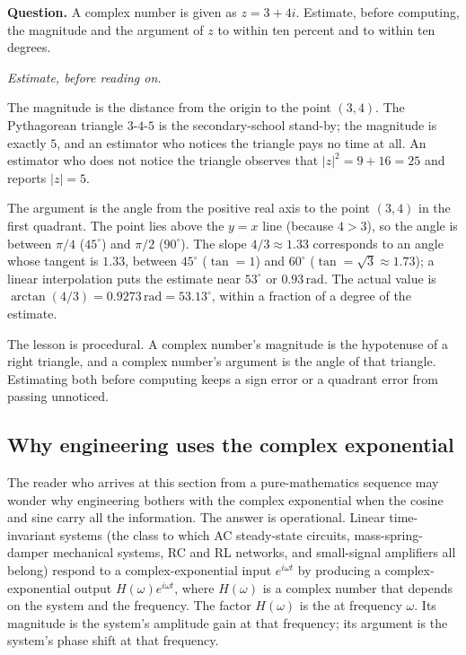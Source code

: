 \begin{estimation}
\textbf{Question.} A complex number is given as $z = 3 + 4i$.
Estimate, before computing, the magnitude and the argument of
$z$ to within ten percent and to within ten degrees.

\smallskip
\textit{Estimate, before reading on.}

\smallskip
The magnitude is the distance from the origin to the point
$(3, 4)$. The Pythagorean triangle $3$-$4$-$5$ is the
secondary-school stand-by; the magnitude is exactly $5$, and an
estimator who notices the triangle pays no time at all. An
estimator who does not notice the triangle observes that
$|z|^{2} = 9 + 16 = 25$ and reports $|z| = 5$.

The argument is the angle from the positive real axis to the
point $(3, 4)$ in the first quadrant. The point lies above the
$y = x$ line (because $4 > 3$), so the angle is between $\pi/4$
($45^{\circ}$) and $\pi/2$ ($90^{\circ}$). The slope $4/3 \approx
1.33$ corresponds to an angle whose tangent is $1.33$, between
$45^{\circ}$ ($\tan = 1$) and $60^{\circ}$ ($\tan = \sqrt{3}
\approx 1.73$); a linear interpolation puts the estimate near
$53^{\circ}$ or $0.93 \,\text{rad}$. The actual value is
$\arctan(4/3) = 0.9273 \,\text{rad} = 53.13^{\circ}$, within a
fraction of a degree of the estimate.

The lesson is procedural. A complex number's magnitude is the
hypotenuse of a right triangle, and a complex number's argument
is the angle of that triangle. Estimating both before computing
keeps a sign error or a quadrant error from passing unnoticed.
\end{estimation}

\subsection{Why engineering uses the complex exponential}

The reader who arrives at this section from a pure-mathematics
sequence may wonder why engineering bothers with the complex
exponential when the cosine and sine carry all the information.
The answer is operational. Linear time-invariant systems (the
class to which AC steady-state circuits, mass-spring-damper
mechanical systems, RC and RL networks, and small-signal
amplifiers all belong) respond to a complex-exponential input
$e^{i\omega t}$ by producing a complex-exponential output
$H(\omega) e^{i\omega t}$, where $H(\omega)$ is a complex number
that depends on the system and the frequency. The factor
$H(\omega)$ is the  at frequency
$\omega$. Its magnitude is the system's amplitude gain at that
frequency; its argument is the system's phase shift at that
frequency.

